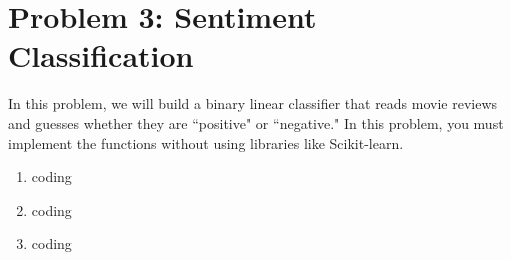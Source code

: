 \documentclass[10pt]{article}
\begin{document}
\section*{\normalsize Problem 3: Sentiment Classification}

In this problem, we will build a binary linear classifier that reads movie reviews and guesses whether they are ``positive" or ``negative." In this problem, you must implement the functions without using libraries like Scikit-learn.

\begin{enumerate}[label=(\alph*)]

  \item coding
  \item coding
  \item coding

\end{enumerate}
\end{document}
